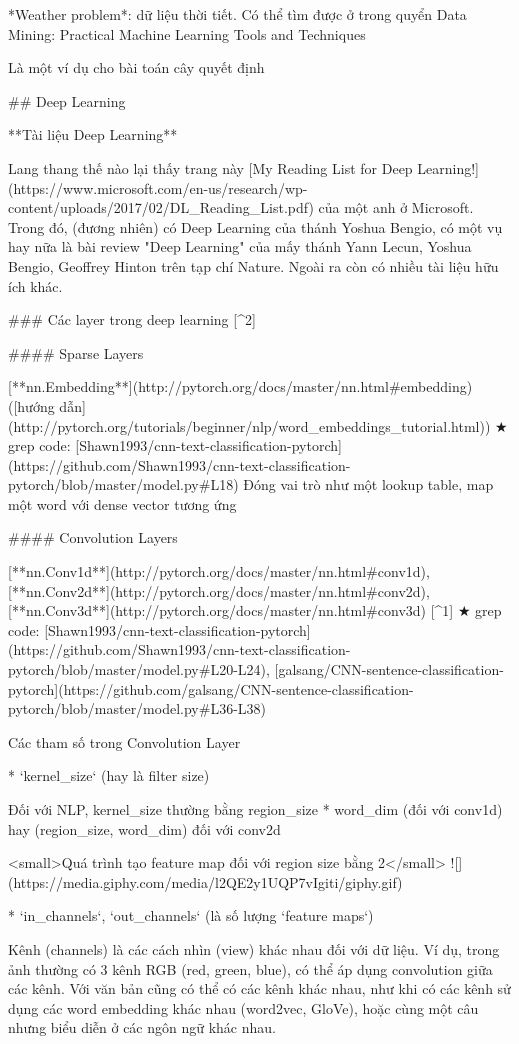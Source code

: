 *Weather problem*: dữ liệu thời tiết. Có thể tìm được ở trong quyển Data Mining: Practical Machine Learning Tools and Techniques

Là một ví dụ cho bài toán cây quyết định

## Deep Learning

**Tài liệu Deep Learning**

Lang thang thế nào lại thấy trang này [My Reading List for Deep Learning!](https://www.microsoft.com/en-us/research/wp-content/uploads/2017/02/DL_Reading_List.pdf) của một anh ở Microsoft. Trong đó, (đương nhiên) có Deep Learning của thánh Yoshua Bengio, có một vụ hay nữa là bài review "Deep Learning" của mấy thánh Yann Lecun, Yoshua Bengio, Geoffrey Hinton trên tạp chí Nature. Ngoài ra còn có nhiều tài liệu hữu ích khác.

### Các layer trong deep learning [^2]

#### Sparse Layers

[**nn.Embedding**](http://pytorch.org/docs/master/nn.html#embedding) ([hướng dẫn](http://pytorch.org/tutorials/beginner/nlp/word_embeddings_tutorial.html))
★ grep code: [Shawn1993/cnn-text-classification-pytorch](https://github.com/Shawn1993/cnn-text-classification-pytorch/blob/master/model.py#L18)
Đóng vai trò như một lookup table, map một word với dense vector tương ứng

#### Convolution Layers

[**nn.Conv1d**](http://pytorch.org/docs/master/nn.html#conv1d), [**nn.Conv2d**](http://pytorch.org/docs/master/nn.html#conv2d), [**nn.Conv3d**](http://pytorch.org/docs/master/nn.html#conv3d) [^1]
★ grep code: [Shawn1993/cnn-text-classification-pytorch](https://github.com/Shawn1993/cnn-text-classification-pytorch/blob/master/model.py#L20-L24), [galsang/CNN-sentence-classification-pytorch](https://github.com/galsang/CNN-sentence-classification-pytorch/blob/master/model.py#L36-L38)

Các tham số trong Convolution Layer

* `kernel_size` (hay là filter size)

Đối với NLP, kernel_size thường bằng region_size * word_dim (đối với conv1d) hay (region_size, word_dim) đối với conv2d

<small>Quá trình tạo feature map đối với region size bằng 2</small>
![](https://media.giphy.com/media/l2QE2y1UQP7vIgiti/giphy.gif)

* `in_channels`, `out_channels` (là số lượng `feature maps`)

Kênh (channels) là các cách nhìn (view) khác nhau đối với dữ liệu. Ví dụ, trong ảnh thường có 3 kênh RGB (red, green, blue), có thể áp dụng convolution giữa các kênh. Với văn bản cũng có thể có các kênh khác nhau, như khi có các kênh sử dụng các word embedding khác nhau (word2vec, GloVe), hoặc cùng một câu nhưng biểu diễn ở các ngôn ngữ khác nhau.

